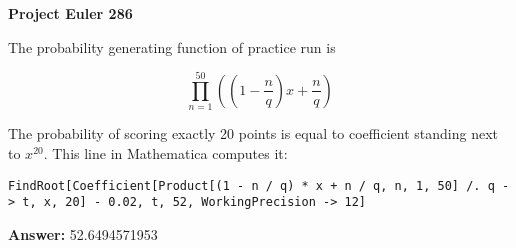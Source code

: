 \documentclass[a4paper,12pt]{article}
\begin{document}
\setlength\parindent{0pt}
\textbf{Project Euler 286}
\vspace{5ex}

The probability generating function of practice run is

\[\prod_{n = 1}^{50} \left( \left(1 - \frac{n}{q}\right)x + \frac{n}{q} \right)\]

The probability of scoring exactly 20 points is equal to coefficient standing next to \(x^{20}\). This line in Mathematica computes it:

\texttt{FindRoot[Coefficient[Product[(1 - n / q) * x + n / q, {n, 1, 50}] /. q -> t, x, 20] - 0.02, {t, 52}, WorkingPrecision -> 12]}

\vspace{5ex}
\textbf{Answer:}
52.6494571953
\end{document}
